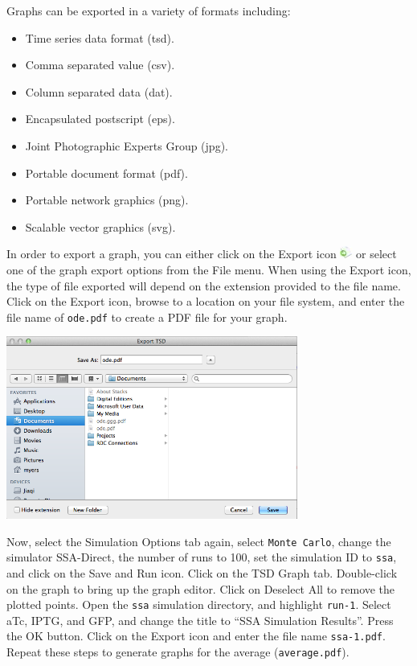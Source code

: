 \documentclass[titlepage,11pt]{article}
\begin{document}
Graphs can be exported in a variety of formats including:
\begin{itemize}
\item Time series data format (tsd).
\item Comma separated value (csv).
\item Column separated data (dat).
\item Encapsulated postscript (eps). 
\item Joint Photographic Experts Group (jpg). 
\item Portable document format (pdf).
\item Portable network graphics (png). 
\item Scalable vector graphics (svg).
\end{itemize}
In order to export a graph, you can either click on the Export icon \includegraphics{../gui/icons/export} or select one of the graph export options from the File menu.  When using the Export icon, the type of file exported will depend on the extension provided to the file name.  Click on the Export icon, browse to a location on your file system, and enter the file name of {\tt ode.pdf} to create a PDF file for your graph.

\begin{center}
\includegraphics[height=60mm]{screenshots/exportTSD}
\end{center}

Now, select the Simulation Options tab again, select {\tt Monte Carlo}, change the simulator SSA-Direct, the number of runs to 100, set the simulation ID to {\tt ssa}, and click on the Save and Run icon.  Click on the TSD Graph tab.  Double-click on the graph to bring up the graph editor.  Click on Deselect All to remove the plotted points.  Open the {\tt ssa} simulation directory, and highlight {\tt run-1}.  Select aTc, IPTG, and GFP, and change the title to ``SSA Simulation Results''. Press the OK button.  Click on the Export icon and enter the file name {\tt ssa-1.pdf}.  Repeat these steps to generate graphs for the average ({\tt average.pdf}).
\end{document}
